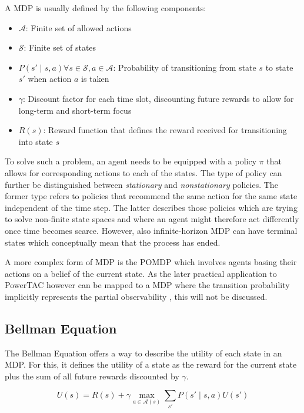 A \ac{MDP} is usually defined by the following components:

\begin{itemize}
    \item $\mathcal{A}$: Finite set of allowed actions
    \item $\mathcal{S}$: Finite set of states
    \item $P(s' \mid s,a) \forall s \in \mathcal{S}, a \in \mathcal{A}$: Probability of transitioning from state
        $s$ to state $s'$ when action $a$ is taken
    \item $\gamma$: Discount factor for each time slot, discounting future rewards to allow for long-term and
        short-term focus
    \item $R(s)$: Reward function that defines the reward received for transitioning into state $s$
\end{itemize}

To solve such a problem, an agent needs to be equipped with a policy $\pi$ that allows for corresponding actions to each
of the states. The type of policy can further be distinguished between \emph{stationary} and \emph{nonstationary}
policies. The former type refers to policies that recommend the same action for the same state independent of the
time step. The latter describes those policies which are trying to solve non-finite state spaces and where an
agent might therefore act differently once time becomes scarce. However, also infinite-horizon \ac{MDP} can have
terminal states which conceptually mean that the process has ended.

A more complex form of \ac{MDP} is the \ac{POMDP} which involves agents basing their actions on a belief of the
current state. As the later practical application to \ac{PowerTAC}  however can be mapped to a \ac{MDP}
where the transition probability implicitly represents the partial observability \citep{tactexurieli2016mdp}, this will not be discussed.

\subsection{Bellman Equation}%
\label{ssub:bellman_equation}

The Bellman Equation offers a way to describe the utility of each state in an \ac{MDP}. For this, it defines the
utility of a state as the reward for the current state plus the sum of all future rewards discounted by $\gamma$.

\begin{equation}
    U(s) = R(s) + \gamma \max_{a\in\mathcal{A}(s)} \sum_{s'}{P(s' \mid s,a)U(s')}
\end{equation}

